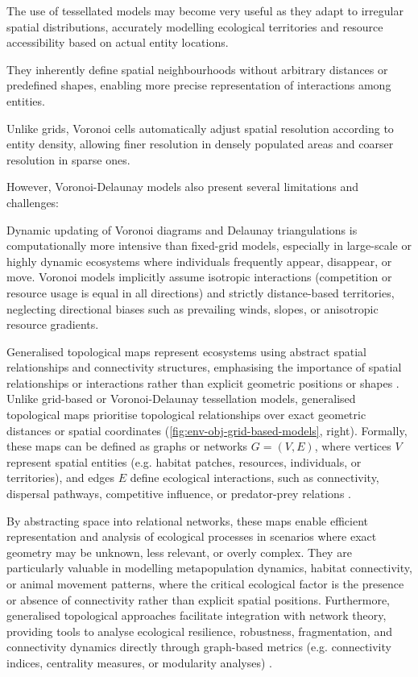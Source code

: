The use of tessellated models may become very useful as they adapt to irregular spatial distributions, accurately modelling ecological territories and resource accessibility based on actual entity locations.

They inherently define spatial neighbourhoods without arbitrary distances or predefined shapes, enabling more precise representation of interactions among entities.

Unlike grids, Voronoi cells automatically adjust spatial resolution according to entity density, allowing finer resolution in densely populated areas and coarser resolution in sparse ones.

However, Voronoi-Delaunay models also present several limitations and challenges:
\begin{Itemize}
\Item{} Dynamic updating of Voronoi diagrams and Delaunay triangulations is computationally more intensive than fixed-grid models, especially in large-scale or highly dynamic ecosystems where individuals frequently appear, disappear, or move.
\Item{} Voronoi models implicitly assume isotropic interactions (competition or resource usage is equal in all directions) and strictly distance-based territories, neglecting directional biases such as prevailing winds, slopes, or anisotropic resource gradients.
\end{Itemize}


Generalised topological maps represent ecosystems using abstract spatial relationships and connectivity structures, emphasising the importance of spatial relationships or interactions rather than explicit geometric positions or shapes \cite{Urban2009}. Unlike grid-based or Voronoi-Delaunay tessellation models, generalised topological maps prioritise topological relationships over exact geometric distances or spatial coordinates (\cref{fig:env-obj-grid-based-models}, right). Formally, these maps can be defined as graphs or networks $G = (V, E)$, where vertices $V$ represent spatial entities (e.g. habitat patches, resources, individuals, or territories), and edges $E$ define ecological interactions, such as connectivity, dispersal pathways, competitive influence, or predator-prey relations \cite{Hamonic2021,Minor2008,Peterson2024}.

By abstracting space into relational networks, these maps enable efficient representation and analysis of ecological processes in scenarios where exact geometry may be unknown, less relevant, or overly complex. They are particularly valuable in modelling metapopulation dynamics, habitat connectivity, or animal movement patterns, where the critical ecological factor is the presence or absence of connectivity rather than explicit spatial positions. Furthermore, generalised topological approaches facilitate integration with network theory, providing tools to analyse ecological resilience, robustness, fragmentation, and connectivity dynamics directly through graph-based metrics (e.g. connectivity indices, centrality measures, or modularity analyses) \cite{Lemiere2023,Gaucherel2012}.

